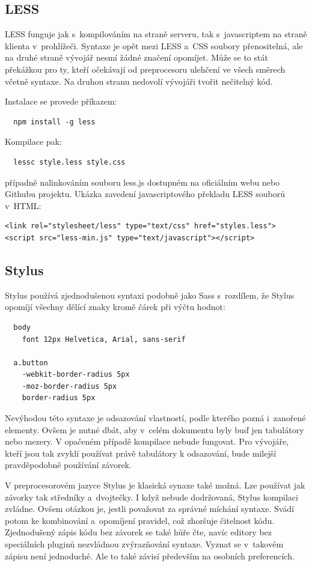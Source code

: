 \documentclass[thesis=B,czech]{FITthesis}[2012/06/26]
\begin{document}
\subsection{LESS}

LESS funguje jak s~kompilováním na straně serveru, tak s~javascriptem na straně klienta v~prohlížeči. Syntaxe je opět mezi LESS a~\gls{CSS} soubory přenositelná, ale na druhé straně vývojář nesmí žádné značení opomíjet. Může se to stát překážkou pro ty, kteří očekávají od preprocesoru ulehčení ve všech směrech včetně syntaxe. Na druhou stranu nedovolí vývojáři tvořit nečitelný kód.

\noindent Instalace se provede příkazem:
\scriptsize
\begin{verbatim}
  npm install -g less
\end{verbatim}
\normalsize
Kompilace pak:
\scriptsize
\begin{verbatim}
  lessc style.less style.css 
\end{verbatim}
\normalsize
případně nalinkováním souboru less.js dostupném na  oficiálním webu nebo Githubu projektu. Ukázka zavedení javascriptového překladu LESS souborů v~\gls{HTML}:
\scriptsize
\begin{verbatim}
<link rel="stylesheet/less" type="text/css" href="styles.less">
<script src="less-min.js" type="text/javascript"></script>
\end{verbatim}
\normalsize

\subsection{Stylus}

Stylus používá zjednodušenou syntaxi podobně jako \gls{Sass} s~rozdílem, že Stylus opomíjí všechny dělící znaky kromě čárek při výčtu hodnot:
\scriptsize
\begin{verbatim}
  body
    font 12px Helvetica, Arial, sans-serif

  a.button
    -webkit-border-radius 5px
    -moz-border-radius 5px
    border-radius 5px
\end{verbatim}
\normalsize
Nevýhodou této syntaxe je odsazování vlastností, podle kterého pozná i~zanořené elementy. Ovšem  je nutné dbát, aby v~celém dokumentu byly buď jen tabulátory nebo mezery. V opačeném případě kompilace nebude fungovat. Pro vývojáře, kteří jsou tak zvyklí používat právě tabulátory k odsazování, bude milejší pravděpodobně používání závorek. 

V preprocesorovém jazyce Stylus je klasická synaxe také možná. Lze používat jak závorky tak středníky a~dvojtečky. I když nebude dodržovaná, Stylus kompilaci zvládne. Ovšem otázkou je, jestli považovat za správné míchání syntaxe. Svádí potom ke kombinování a~opomíjení pravidel, což zhoršuje čitelnost kódu. Zjednodušený zápis kódu bez závorek se také hůře čte, navíc editory bez speciálních pluginů nezvládnou zvýrazňování syntaxe. Vyznat se v~takovém zápisu není jednoduché. Ale to také závisí především na osobních preferencích.
\end{document}
